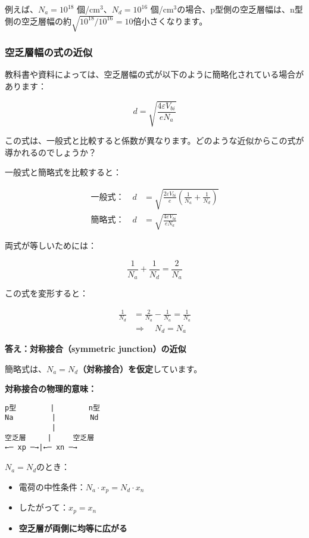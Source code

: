 例えば、$N_a = 10^{18}$ 個/cm$^3$、$N_d = 10^{16}$ 個/cm$^3$の場合、p型側の空乏層幅は、n型側の空乏層幅の約$\sqrt{10^{18}/10^{16}} = 10$倍小さくなります。

\subsubsection{空乏層幅の式の近似}

教科書や資料によっては、空乏層幅の式が以下のように簡略化されている場合があります：

\begin{equation}
d = \sqrt{\frac{4\varepsilon V_{bi}}{eN_a}}
\end{equation}

この式は、一般式と比較すると係数が異なります。どのような近似からこの式が導かれるのでしょうか？

一般式と簡略式を比較すると：

\begin{align}
\text{一般式：} \quad d &= \sqrt{\frac{2\varepsilon V_{bi}}{e}\left(\frac{1}{N_a} + \frac{1}{N_d}\right)} \\
\text{簡略式：} \quad d &= \sqrt{\frac{4\varepsilon V_{bi}}{eN_a}}
\end{align}

両式が等しいためには：

\begin{equation}
\frac{1}{N_a} + \frac{1}{N_d} = \frac{2}{N_a}
\end{equation}

この式を変形すると：

\begin{align}
\frac{1}{N_d} &= \frac{2}{N_a} - \frac{1}{N_a} = \frac{1}{N_a} \\
&\Rightarrow \quad \boxed{N_d = N_a}
\end{align}

\textbf{答え：対称接合（symmetric junction）の近似}

簡略式は、\textbf{$N_a = N_d$（対称接合）を仮定}しています。

\textbf{対称接合の物理的意味：}

\begin{verbatim}
p型        |        n型
Na         |        Nd
           |
空乏層     |     空乏層
←─ xp ─→|←─ xn ─→
\end{verbatim}

$N_a = N_d$のとき：

\begin{itemize}
\item 電荷の中性条件：$N_a \cdot x_p = N_d \cdot x_n$
\item したがって：$x_p = x_n$
\item \textbf{空乏層が両側に均等に広がる}
\end{itemize}

